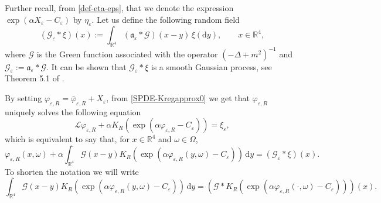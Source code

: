 \documentclass{article}
\newcommand{\assign}{:=}
\newcommand{\mathd}{\mathrm{d}}
\begin{document}
Further recall, from \eqref{def-eta-eps}, that we denote the expression $\exp (\alpha X_{\varepsilon} -
C_{\varepsilon})$ by $\eta_{\varepsilon}$. Let us define the following random field
%
\begin{equation}
  (\mathcal{G}_{\varepsilon} \ast \xi) (x) \assign \int_{\mathbb{R}^4}
  (\mathfrak{a}_{\varepsilon} \ast \mathcal{G}) (x - y) \, \xi (\mathd y), \qquad x \in
  \mathbb{R}^4, \label{defn-varphi-0}
\end{equation}
%
where $\mathcal{G}$ is the Green function associated with the operator $(-
\Delta + m^2)^{- 1}$ and $\mathcal{G}_{\varepsilon} \assign
\mathfrak{a}_{\varepsilon} \ast \mathcal{G}$. It can be shown that
$\mathcal{G}_{\varepsilon} \ast \xi$ is a smooth Gaussian process, see Theorem 5.1 of {\cite{mourratGlobalWellposednessDynamic2017}}. 

By setting $\varphi_{\varepsilon, R} = \bar{\varphi}_{\varepsilon, R} +
X_{\varepsilon}$, from \eqref{SPDE-Kregapprox0} we get that
$\varphi_{\varepsilon, R}$ uniquely solves the following equation
%
\begin{equation}\label{SPDE-e-R-approx}
    \mathcal{L} \varphi_{\varepsilon, R} + \alpha K_R (\exp (\alpha
    \varphi_{\varepsilon, R} - C_{\varepsilon})) = \xi_{\varepsilon},
\end{equation}
%
which is equivalent to say that, for $x \in \mathbb{R}^4$ and $\omega \in \Omega$,
\begin{equation}\label{int-form-e-R-approx}
    \varphi_{\varepsilon, R} (x, \omega) + \alpha \int_{\mathbb{R}^4}
    \mathcal{G} (x - y) K_R (\exp (\alpha \varphi_{\varepsilon, R} (y, \omega)
    - C_{\varepsilon})) \, \mathd y = (\mathcal{G}_{\varepsilon} \ast \xi) (x) .
\end{equation}
%
To shorten the notation we will write \begin{equation}
    \int_{\mathbb{R}^4} \mathcal{G} (x - y) K_R (\exp (\alpha
     \varphi_{\varepsilon, R} (y, \omega) - C_{\varepsilon})) \, \mathd y =
     (\mathcal{G} \ast K_R (\exp (\alpha \varphi_{\varepsilon, R} (\cdot,
     \omega) - C_{\varepsilon}))) (x) .    
\end{equation}
\end{document}

